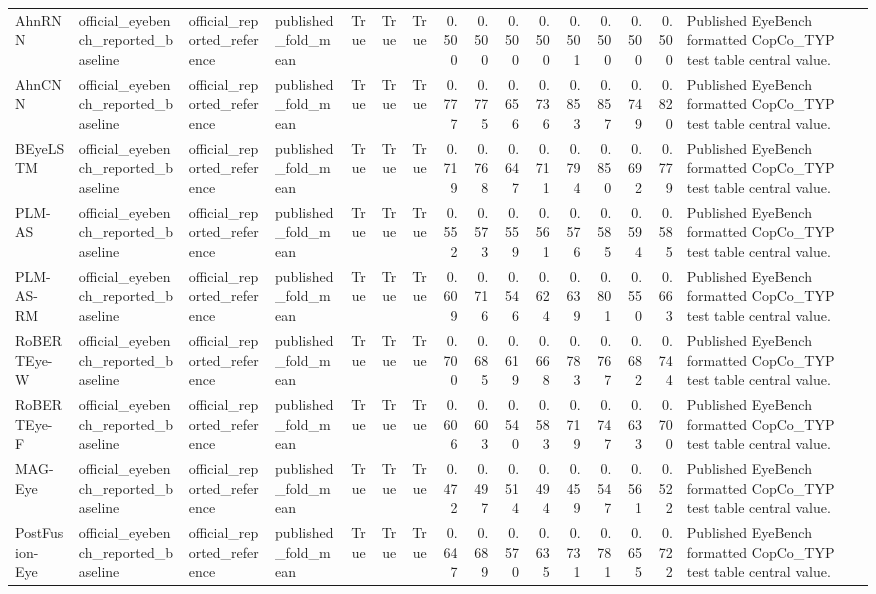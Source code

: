 \begin{tabular}{llllrrrrrrrrrrrl}
AhnRNN~\citep{ahn2020towards} & official_eyebench_reported_baseline & official_reported_reference & published_fold_mean & True & True & True & 0.500 & 0.500 & 0.500 & 0.500 & 0.501 & 0.500 & 0.500 & 0.500 & Published EyeBench formatted CopCo_TYP test table central value. \\
AhnCNN~\citep{ahn2020towards} & official_eyebench_reported_baseline & official_reported_reference & published_fold_mean & True & True & True & 0.777 & 0.775 & 0.656 & 0.736 & 0.853 & 0.857 & 0.749 & 0.820 & Published EyeBench formatted CopCo_TYP test table central value. \\
BEyeLSTM~\citep{reich_inferring_2022} & official_eyebench_reported_baseline & official_reported_reference & published_fold_mean & True & True & True & 0.719 & 0.768 & 0.647 & 0.711 & 0.794 & 0.850 & 0.692 & 0.779 & Published EyeBench formatted CopCo_TYP test table central value. \\
PLM-AS~\citep{Yang2023PLMASPL} & official_eyebench_reported_baseline & official_reported_reference & published_fold_mean & True & True & True & 0.552 & 0.573 & 0.559 & 0.561 & 0.576 & 0.585 & 0.594 & 0.585 & Published EyeBench formatted CopCo_TYP test table central value. \\
PLM-AS-RM~\citep{haller2022eye} & official_eyebench_reported_baseline & official_reported_reference & published_fold_mean & True & True & True & 0.609 & 0.716 & 0.546 & 0.624 & 0.639 & 0.801 & 0.550 & 0.663 & Published EyeBench formatted CopCo_TYP test table central value. \\
RoBERTEye-W~\citep{Shubi2024Finegrained} & official_eyebench_reported_baseline & official_reported_reference & published_fold_mean & True & True & True & 0.700 & 0.685 & 0.619 & 0.668 & 0.783 & 0.767 & 0.682 & 0.744 & Published EyeBench formatted CopCo_TYP test table central value. \\
RoBERTEye-F~\citep{Shubi2024Finegrained} & official_eyebench_reported_baseline & official_reported_reference & published_fold_mean & True & True & True & 0.606 & 0.603 & 0.540 & 0.583 & 0.719 & 0.747 & 0.633 & 0.700 & Published EyeBench formatted CopCo_TYP test table central value. \\
MAG-Eye~\citep{Shubi2024Finegrained} & official_eyebench_reported_baseline & official_reported_reference & published_fold_mean & True & True & True & 0.472 & 0.497 & 0.514 & 0.494 & 0.459 & 0.547 & 0.561 & 0.522 & Published EyeBench formatted CopCo_TYP test table central value. \\
PostFusion-Eye~\citep{Shubi2024Finegrained} & official_eyebench_reported_baseline & official_reported_reference & published_fold_mean & True & True & True & 0.647 & 0.689 & 0.570 & 0.635 & 0.731 & 0.781 & 0.655 & 0.722 & Published EyeBench formatted CopCo_TYP test table central value. \\
\bottomrule
\end{tabular}
